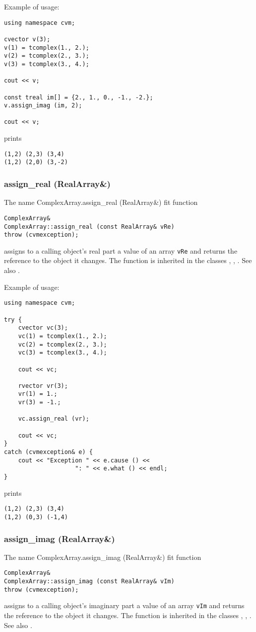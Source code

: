 Example of usage:
\begin{verbatim}
using namespace cvm;

cvector v(3);
v(1) = tcomplex(1., 2.);
v(2) = tcomplex(2., 3.);
v(3) = tcomplex(3., 4.);

cout << v;

const treal im[] = {2., 1., 0., -1., -2.};
v.assign_imag (im, 2);

cout << v;
\end{verbatim}
prints
\begin{verbatim}
(1,2) (2,3) (3,4)
(1,2) (2,0) (3,-2)
\end{verbatim}
\newpage




\subsubsection{assign\_real (RealArray\&)}
The%
\pdfdest name {ComplexArray.assign_real (RealArray&)} fit{ }
function
\begin{verbatim}
ComplexArray&
ComplexArray::assign_real (const RealArray& vRe)
throw (cvmexception);
\end{verbatim}
assigns to a calling object's real part
a value of an array
\verb"vRe" and returns the reference to
the object it changes.
The function is inherited in the classes
,
,
.
See also .

Example of usage:
\begin{verbatim}
using namespace cvm;

try {
    cvector vc(3);
    vc(1) = tcomplex(1., 2.);
    vc(2) = tcomplex(2., 3.);
    vc(3) = tcomplex(3., 4.);

    cout << vc;

    rvector vr(3);
    vr(1) = 1.;
    vr(3) = -1.;

    vc.assign_real (vr);

    cout << vc;
}
catch (cvmexception& e) {
    cout << "Exception " << e.cause () <<
                    ": " << e.what () << endl;
}
\end{verbatim}
prints
\begin{verbatim}
(1,2) (2,3) (3,4)
(1,2) (0,3) (-1,4)
\end{verbatim}
\newpage



\subsubsection{assign\_imag (RealArray\&)}
The%
\pdfdest name {ComplexArray.assign_imag (RealArray&)} fit{ }
function
\begin{verbatim}
ComplexArray&
ComplexArray::assign_imag (const RealArray& vIm)
throw (cvmexception);
\end{verbatim}
assigns to a calling object's imaginary part
a value of an array
\verb"vIm" and returns the reference to
the object it changes.
The function is inherited in the classes
,
,
.
See also .

